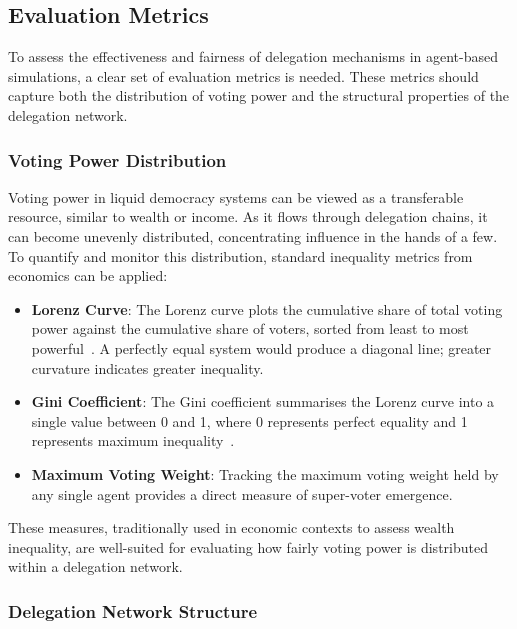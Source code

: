 \subsection{Evaluation Metrics}

To assess the effectiveness and fairness of delegation mechanisms in agent-based simulations, a clear set of evaluation metrics is needed. These metrics should capture both the distribution of voting power and the structural properties of the delegation network.

\subsubsection{Voting Power Distribution}

Voting power in liquid democracy systems can be viewed as a transferable resource, similar to wealth or income. As it flows through delegation chains, it can become unevenly distributed, concentrating influence in the hands of a few. To quantify and monitor this distribution, standard inequality metrics from economics can be applied:

\begin{itemize}
    \item \textbf{Lorenz Curve}: The Lorenz curve plots the cumulative share of total voting power against the cumulative share of voters, sorted from least to most powerful~\citep{cowell_measuring_inequality}. A perfectly equal system would produce a diagonal line; greater curvature indicates greater inequality.
    \item \textbf{Gini Coefficient}: The Gini coefficient summarises the Lorenz curve into a single value between 0 and 1, where 0 represents perfect equality and 1 represents maximum inequality~\citep{cowell_measuring_inequality}.
    \item \textbf{Maximum Voting Weight}: Tracking the maximum voting weight held by any single agent provides a direct measure of super-voter emergence.
\end{itemize}

These measures, traditionally used in economic contexts to assess wealth inequality, are well-suited for evaluating how fairly voting power is distributed within a delegation network.

\subsubsection{Delegation Network Structure}

